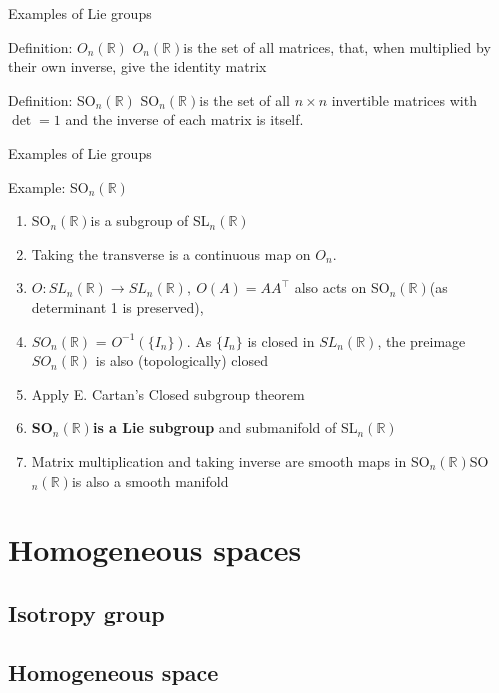 \documentclass[smaller,xcolor=dvipsnames]{beamer}
\newcommand{\sln}{SL$_n(\mathbb{R})$}
\newcommand{\son}{SO$_{n}(\mathbb{R})$}
\begin{document}
\begin{frame}{Examples of Lie groups}



\newcommand{\on}{$O_n(\mathbb{R})$}
\begin{block}{Definition: \on}
\on is the set of all matrices, that, when multiplied by their own inverse, give the identity matrix
\end{block}
\begin{block}{Definition: \son}
\son  is the set of all $n\times n$ invertible matrices with $\det = 1$ and the inverse of each matrix is itself.
\end{block}
\end{frame}

\begin{frame}{Examples of Lie groups}
    
\begin{block}{Example: \son}
\begin{enumerate}
    \item \son is a subgroup of \sln
    \item Taking the transverse is a continuous map on $O_n$.
    \item $O:SL_n(\mathbb{R}) \rightarrow SL_n(\mathbb{R}),\ O(A) = AA^{\top}$ also acts on \son (as determinant 1 is preserved), 
    \item $SO_n(\mathbb{R})$ = $O^{-1}(\{I_n\})$. As $\{I_n\}$ is closed in $SL_n(\mathbb{R})$, the preimage $SO_n(\mathbb{R})$ is also (topologically) closed
    \item Apply E. Cartan's Closed subgroup theorem
    \item \textbf{\son is a Lie subgroup} and submanifold of \sln
    \item Matrix multiplication and taking inverse are smooth maps in \son \implies \son is also a smooth manifold
\end{enumerate}
\end{block}
\end{frame}

\section{Homogeneous spaces}
\subsection{Isotropy group}
\subsection{Homogeneous space}
\end{document}
